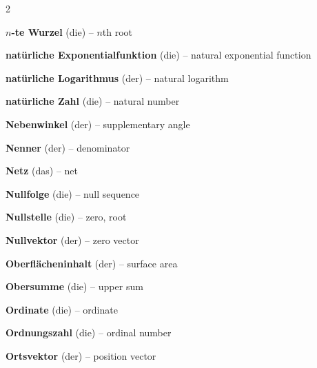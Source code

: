 \begin{multicols}{2}
\par\nopagebreak
\textbf{$n$-te Wurzel} (die) -- $n$th root\dotfill\hyperref[e:47]{\pageref*{e:47}}\par
\textbf{natürliche Exponentialfunktion} (die) -- natural exponential function\dotfill\hyperref[e:299]{\pageref*{e:299}}\par
\textbf{natürliche Logarithmus} (der) -- natural logarithm\dotfill\hyperref[e:300]{\pageref*{e:300}}\par
\textbf{natürliche Zahl} (die) -- natural number\dotfill\hyperref[e:5]{\pageref*{e:5}}\par
\textbf{Nebenwinkel} (der) -- supplementary angle\dotfill\hyperref[e:163]{\pageref*{e:163}}\par
\textbf{Nenner} (der) -- denominator\dotfill\hyperref[e:30]{\pageref*{e:30}}\par
\textbf{Netz} (das) -- net\dotfill\hyperref[e:253]{\pageref*{e:253}}\par
\textbf{Nullfolge} (die) -- null sequence\dotfill\hyperref[e:258]{\pageref*{e:258}}\par
\textbf{Nullstelle} (die) -- zero, root\dotfill\hyperref[e:122]{\pageref*{e:122}}\par
\textbf{Nullvektor} (der) -- zero vector\dotfill\hyperref[e:304]{\pageref*{e:304}}\par

\par\nopagebreak
\textbf{Oberflächeninhalt} (der) -- surface area\dotfill\hyperref[e:256]{\pageref*{e:256}}\par
\textbf{Obersumme} (die) -- upper sum\dotfill\hyperref[e:293]{\pageref*{e:293}}\par
\textbf{Ordinate} (die) -- ordinate\dotfill\hyperref[e:118]{\pageref*{e:118}}\par
\textbf{Ordnungszahl} (die) -- ordinal number\dotfill\hyperref[e:3]{\pageref*{e:3}}\par
\textbf{Ortsvektor} (der) -- position vector\dotfill\hyperref[e:302]{\pageref*{e:302}}\par


\end{multicols}

